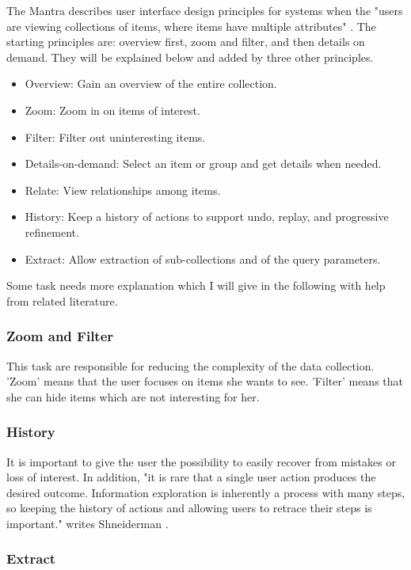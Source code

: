 \documentclass[11pt]{report}
\begin{document}
The Mantra describes user interface design principles for systems when the "users are viewing collections of items, where items have multiple attributes" \cite{Shneiderman1996}. The starting principles are: overview first, zoom and filter, and then details on demand. They will be explained below and added by three other principles. \\

\begin{itemize}
	\item Overview: Gain an overview of the entire collection.
	\item Zoom: Zoom in on items of interest.
	\item Filter: Filter out uninteresting items.
	\item Details-on-demand: Select an item or group and get details when needed.
	\item Relate: View relationships among items.
	\item History: Keep a history of actions to support undo, replay, and progressive refinement.
	\item Extract: Allow extraction of sub-collections and of the query parameters.
\end{itemize}

Some task needs more explanation which I will give in the following with help from related literature.

\subsubsection{Zoom and Filter}

This task are responsible for reducing the complexity of the data collection. 'Zoom' means that the user focuses on items she wants to see. 'Filter' means that she can hide items which are not interesting for her.

\subsubsection{History}

It is important to give the user the possibility to easily recover from mistakes or loss of interest. In addition, "it is rare that a single user action produces the desired outcome. Information exploration is inherently a process with many steps, so keeping the history of actions and allowing users to retrace their steps is important." writes Shneiderman \cite{Shneiderman1996}.

\subsubsection{Extract}
\end{document}

